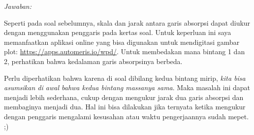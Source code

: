 \documentclass[11pt,fleqn]{exam}
\begin{document}
\begin{questions}
\textit{Jawaban: }

Seperti pada soal sebelumnya, skala dan jarak antara garis absorpsi dapat diukur dengan menggunakan penggaris pada kertas soal. Untuk keperluan ini saya memanfaatkan aplikasi online yang bisa digunakan untuk mendigitasi gambar plot: \url{https://apps.automeris.io/wpd/}. Untuk membedakan mana bintang 1 dan 2, perhatikan bahwa kedalaman garis absorpsinya berbeda.

Perlu diperhatikan bahwa karena di soal dibilang kedua bintang mirip, \textit{kita bisa asumsikan di awal bahwa kedua bintang massanya sama}. Maka masalah ini dapat menjadi lebih sederhana, cukup dengan mengukur jarak dua garis absorpsi dan membaginya menjadi dua. Hal ini bisa dilakukan jika ternyata ketika mengukur dengan penggaris mengalami kesusahan atau waktu pengerjaannya sudah mepet. ;)


\end{questions}
\end{document}
